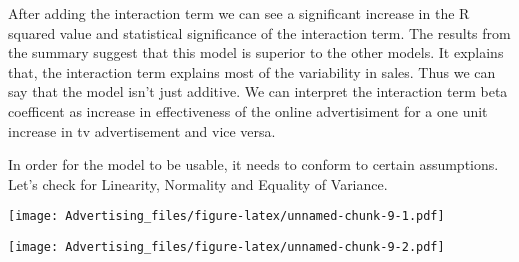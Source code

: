 \documentclass[
]{article}
\newenvironment{Shaded}{\begin{snugshade}}{\end{snugshade}}
\newcommand{\CommentTok}[1]{\textcolor[rgb]{0.56,0.35,0.01}{\textit{#1}}}
\newcommand{\DataTypeTok}[1]{\textcolor[rgb]{0.13,0.29,0.53}{#1}}
\newcommand{\DecValTok}[1]{\textcolor[rgb]{0.00,0.00,0.81}{#1}}
\newcommand{\KeywordTok}[1]{\textcolor[rgb]{0.13,0.29,0.53}{\textbf{#1}}}
\newcommand{\NormalTok}[1]{#1}
\newcommand{\OperatorTok}[1]{\textcolor[rgb]{0.81,0.36,0.00}{\textbf{#1}}}
\newcommand{\StringTok}[1]{\textcolor[rgb]{0.31,0.60,0.02}{#1}}
\begin{document}
After adding the interaction term we can see a significant increase in
the R squared value and statistical significance of the interaction
term. The results from the summary suggest that this model is superior
to the other models. It explains that, the interaction term explains
most of the variability in sales. Thus we can say that the model isn't
just additive. We can interpret the interaction term beta coefficent as
increase in effectiveness of the online advertisiment for a one unit
increase in tv advertisement and vice versa.

In order for the model to be usable, it needs to conform to certain
assumptions. Let's check for Linearity, Normality and Equality of
Variance.

\begin{Shaded}
\end{Shaded}

\texttt{[image: Advertising\_files/figure-latex/unnamed-chunk-9-1.pdf]}

\begin{Shaded}
\end{Shaded}

\texttt{[image: Advertising\_files/figure-latex/unnamed-chunk-9-2.pdf]}

\begin{Shaded}
\end{Shaded}
\end{document}
